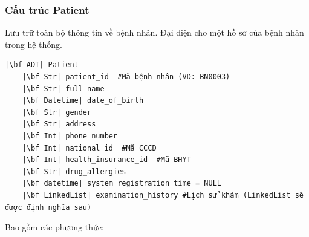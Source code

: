 \subsubsection{Cấu trúc Patient}
 Lưu trữ toàn bộ thông tin về bệnh nhân. Đại diện cho một hồ sơ của bệnh nhân trong hệ thống.
\begin{verbatim}
|\bf ADT| Patient
    |\bf Str| patient_id  #Mã bệnh nhân (VD: BN0003)
    |\bf Str| full_name 
    |\bf Datetime| date_of_birth 
    |\bf Str| gender 
    |\bf Str| address 
    |\bf Int| phone_number 
    |\bf Int| national_id  #Mã CCCD
    |\bf Int| health_insurance_id  #Mã BHYT
    |\bf Str| drug_allergies 
    |\bf datetime| system_registration_time = NULL
    |\bf LinkedList| examination_history #Lịch sử khám (LinkedList sẽ được định nghĩa sau)
\end{verbatim}
Bao gồm các phương thức:
